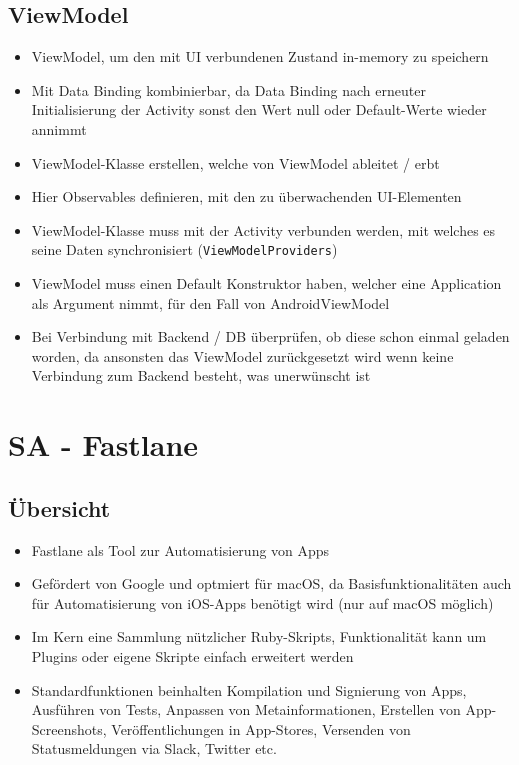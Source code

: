 \documentclass[a4paper]{article}
\begin{document}
		\subsection{ViewModel}
		
		\begin{itemize}
			\item ViewModel, um den mit UI verbundenen Zustand in-memory zu speichern
			\item Mit Data Binding kombinierbar, da Data Binding nach erneuter Initialisierung der Activity sonst den Wert null oder Default-Werte wieder annimmt
			\item ViewModel-Klasse erstellen, welche von ViewModel ableitet / erbt
			\item Hier Observables definieren, mit den zu überwachenden UI-Elementen
			\item ViewModel-Klasse muss mit der Activity verbunden werden, mit welches es seine Daten synchronisiert (\texttt{ViewModelProviders})
			\item ViewModel muss einen Default Konstruktor haben, welcher eine Application als Argument nimmt, für den Fall von AndroidViewModel
			\item Bei Verbindung mit Backend / DB überprüfen, ob diese schon einmal geladen worden, da ansonsten das ViewModel zurückgesetzt wird wenn keine Verbindung zum Backend besteht, was unerwünscht ist
		\end{itemize}
		
	
	\section{SA - Fastlane}
	
		\subsection{Übersicht}
		
		\begin{itemize}
			\item Fastlane als Tool zur Automatisierung von Apps
			\item Gefördert von Google und optmiert für macOS, da Basisfunktionalitäten auch für Automatisierung von iOS-Apps benötigt wird (nur auf macOS möglich)
			\item Im Kern eine Sammlung nützlicher Ruby-Skripts, Funktionalität kann um Plugins oder eigene Skripte einfach erweitert werden
			\item Standardfunktionen beinhalten Kompilation und Signierung von Apps, Ausführen von Tests, Anpassen von Metainformationen, Erstellen von App-Screenshots, Veröffentlichungen in App-Stores, Versenden von Statusmeldungen via Slack, Twitter etc.
		\end{itemize}
	
\end{document}
